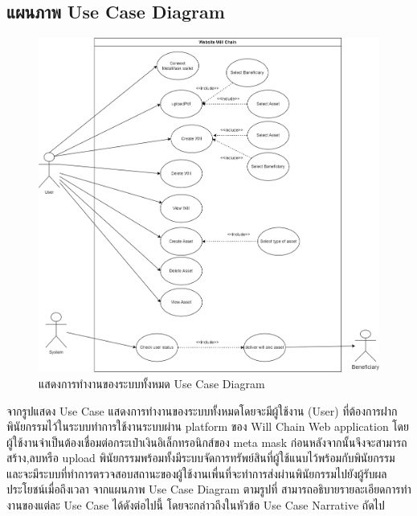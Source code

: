 \documentclass[12pt,oneside,openright,a4paper]{cpe-thai-project}
\begin{document}
\subsection{แผนภาพ Use Case Diagram}
	\begin{figure}[!htb]
		\centering
		\includegraphics[scale=0.2]{UseCaseDiagram}
		\caption{แสดงการทำงานของระบบทั้งหมด Use Case Diagram}
	\end{figure}
\FloatBarrier
\tab จากรูปแสดง Use Case แสดงการทำงานของระบบทั้งหมดโดยจะมีผู้ใช้งาน (User) ที่ต้องการฝากพินัยกรรมไว้ในระบบทำการใช้งานระบบผ่าน platform ของ Will Chain Web application  โดยผู้ใช้งานจำเป็นต้องเชื่อมต่อกระเป๋าเงินอิเล็กทรอนิกส์ของ meta mask ก่อนหลังจากนั้นจึงจะสามารถ สร้าง,ลบหรือ upload พินัยกรรมพร้อมทั้งมีระบบจัดการทรัพย์สินที่ผู้ใช้แนบไว้พร้อมกับพินัยกรรม และจะมีระบบที่ทำการตรวจสอบสถานะของผู้ใช้งานเพื่นที่จะทำการส่งผ่านพินัยกรรมไปยังผู้รับผลประโยชน์เมื่อถึงเวลา   จากแผนภาพ Use Case Diagram ตามรูปที่ สามารถอธิบายรายละเอียดการทํา งานของแต่ละ Use Case ได้ดังต่อไปนี้ โดยจะกล่าวถึงในหัวข้อ Use Case Narrative ถัดไป
\clearpage
\end{document}
